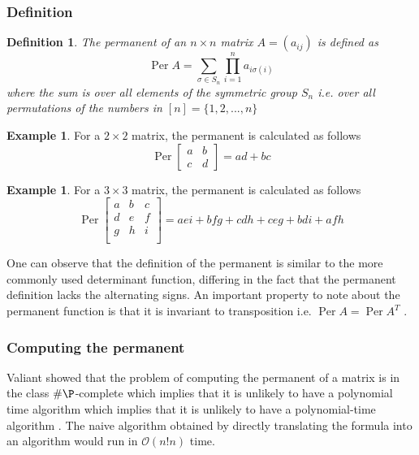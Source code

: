 \documentclass[11pt]{article}
\theoremstyle{theorem}
\theoremstyle{theorem}
\theoremstyle{remark}
\theoremstyle{note}
\theoremstyle{plain}
\newtheorem{definition}[theorem]{Definition}%
\theoremstyle{definition}
\newtheorem{example}[theorem]{Example}
\DeclareMathOperator*{\Per}{\mathrm{Per}}
\begin{document}
\subsubsection{Definition}
\begin{definition}{\cite{marcus_minc66}}
The permanent of an $n \times n$ matrix $A = (a_{ij})$ is defined as
\begin{equation}
\Per A = \sum_{\sigma \in S_n} \prod_{i=1}^n a_{i\sigma(i)}
\end{equation}
where the sum is over all elements of the symmetric group $S_n$ i.e. over all permutations of the numbers in $[n] = \{1, 2, ... , n\}$
\end{definition}

\begin{example}
For a $2 \times 2$ matrix, the permanent is calculated as follows
\begin{equation}
\Per 
\begin{bmatrix}
a & b \\
c & d
\end{bmatrix}
= ad + bc
\end{equation}
\end{example}
\begin{example}
For a $3 \times 3$ matrix, the permanent is calculated as follows
\begin{equation}
\Per 
\begin{bmatrix}
a & b & c\\
d & e & f\\
g & h & i\\ 
\end{bmatrix}
= aei +bfg + cdh + ceg + bdi + afh
\end{equation}
\end{example}
One can observe that the definition of the permanent is similar to the more commonly used determinant function, differing in the fact that the permanent definition lacks the alternating signs. An important property to note about the permanent function is that it is invariant to transposition i.e. $\Per A = \Per A^T$ \cite{ryser_1963}.

\subsubsection{Computing the permanent}\label{prelim_permanent_calc}
Valiant showed that the problem of computing the permanent of a matrix is in the class $\# \P$-complete which implies that it is unlikely to have a polynomial time algorithm which implies that it is unlikely to have a polynomial-time algorithm \cite{valiant1979}. The naive algorithm obtained by directly translating the formula into an algorithm would run in $\mathcal{O}(n!n)$ time.
\end{document}

